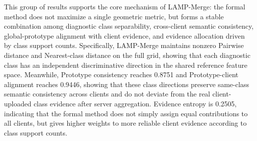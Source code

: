 \documentclass[letterpaper]{article}
\begin{document}
This group of results supports the core mechanism of LAMP-Merge: the formal method does not maximize a single geometric metric, but forms a stable combination among diagnostic class separability, cross-client semantic consistency, global-prototype alignment with client evidence, and evidence allocation driven by class support counts. Specifically, LAMP-Merge maintains nonzero Pairwise distance and Nearest-class distance on the full grid, showing that each diagnostic class has an independent discriminative direction in the shared reference feature space. Meanwhile, Prototype consistency reaches 0.8751 and Prototype-client alignment reaches 0.9446, showing that these class directions preserve same-class semantic consistency across clients and do not deviate from the real client-uploaded class evidence after server aggregation. Evidence entropy is 0.2505, indicating that the formal method does not simply assign equal contributions to all clients, but gives higher weights to more reliable client evidence according to class support counts.
\end{document}
